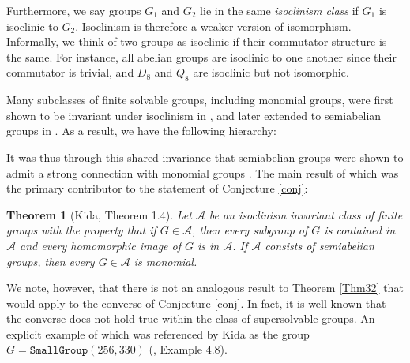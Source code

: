 \documentclass[11pt]{article}
\newtheorem{thm}{Theorem}[section]
\theoremstyle{definition}
\numberwithin{equation}{section}
\begin{document}
\begin{humanblock}
Furthermore, we say groups $G_1$ and $G_2$ lie in the same \textit{isoclinism class} if $G_1$ is isoclinic to $G_2$. Isoclinism is therefore a weaker version of isomorphism. Informally, we think of two groups as isoclinic if their commutator structure is the same. For instance, all abelian groups are isoclinic to one another since their commutator is trivial, and $D_8$ and $Q_8$ are isoclinic but not isomorphic.

Many subclasses of finite solvable groups, including monomial groups, were first shown to be invariant under isoclinism in \cite{bioch1978monomiality}, and later extended to semiabelian groups in \cite{Kida25}. 
As a result, we have the following hierarchy:

\begin{center}
\end{center}

It was thus through this shared invariance that semiabelian groups were shown to admit a strong connection with monomial groups \cite{Kida25}. The main result of which was the primary contributor to the statement of Conjecture \ref{conj}: 

\begin{thm}[Kida, Theorem 1.4]{\label{Thm32}}
     Let $\mathcal{A}$ be an isoclinism invariant class of finite groups with the property that if $G \in \mathcal{A}$, then every subgroup of $G$ is contained in $\mathcal{A}$ and every homomorphic image of $G$ is in $\mathcal{A}$. If $\mathcal{A}$ consists of semiabelian groups, then every $G \in \mathcal{A}$ is monomial.
\end{thm}

We note, however, that there is not an analogous result to Theorem \ref{Thm32} that would apply to the converse of Conjecture \ref{conj}. In fact, it is well known that the converse does not hold true within the class of supersolvable groups. An explicit example of which was referenced by Kida as the group $G = \texttt{SmallGroup}(256,330)$ (\cite{Kida25}, Example 4.8). 

\end{humanblock}
\end{document}
